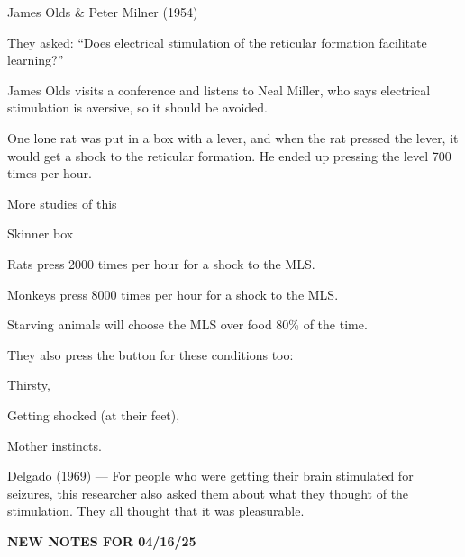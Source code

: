 \begin{coloredlist}
\begin{coloredlist}
\begin{coloredlist}
        \end{coloredlist}
        \item James Olds \& Peter Milner (1954)
        \begin{coloredlist}
            \item They asked: ``Does electrical stimulation of the reticular formation facilitate learning?''
            \item James Olds visits a conference and listens to Neal Miller, who says electrical stimulation is aversive, so it should be avoided.
            \item One lone rat was put in a box with a lever, and when the rat pressed the lever, it would get a shock to the reticular formation. He ended up pressing the level 700 times per hour.
        \end{coloredlist}
        \item More studies of this
        \begin{coloredlist}
            \item Skinner box
            \begin{coloredlist}
                \item Rats press 2000 times per hour for a shock to the MLS.
                \item Monkeys press 8000 times per hour for a shock to the MLS.
                \item Starving animals will choose the MLS over food 80\% of the time. 
                \item They also press the button for these conditions too:
                \begin{coloredlist}
                    \item Thirsty,
                    \item Getting shocked (at their feet),
                    \item Mother instincts.
                \end{coloredlist}
            \end{coloredlist}
        \end{coloredlist}
        \item Delgado (1969) — For people who were getting their brain stimulated for seizures, this researcher also asked them about what they thought of the stimulation. They all thought that it was pleasurable.   
    \end{coloredlist}
\end{coloredlist}

\begin{center}
    \textbf{NEW NOTES FOR 04/16/25} \\
    \hrulefill
\end{center}

